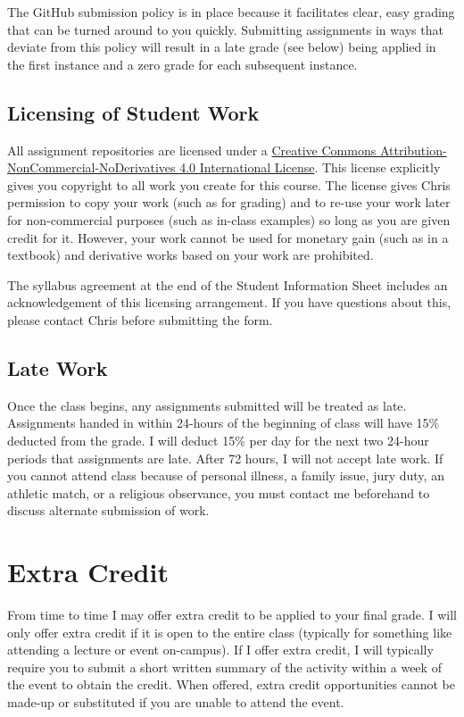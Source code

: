\documentclass[]{book}
\theoremstyle{definition}
\theoremstyle{definition}
\theoremstyle{definition}
\theoremstyle{remark}
\begin{document}
The GitHub submission policy is in place because it facilitates clear,
easy grading that can be turned around to you quickly. Submitting
assignments in ways that deviate from this policy will result in a late
grade (see below) being applied in the first instance and a zero grade
for each subsequent instance.

\subsection{Licensing of Student Work}\label{licensing-of-student-work}

All assignment repositories are licensed under a
\href{https://creativecommons.org/licenses/by-nc-nd/4.0/}{Creative
Commons Attribution-NonCommercial-NoDerivatives 4.0 International
License}. This license explicitly gives you copyright to all work you
create for this course. The license gives Chris permission to copy your
work (such as for grading) and to re-use your work later for
non-commercial purposes (such as in-class examples) so long as you are
given credit for it. However, your work cannot be used for monetary gain
(such as in a textbook) and derivative works based on your work are
prohibited.

The syllabus agreement at the end of the Student Information Sheet
includes an acknowledgement of this licensing arrangement. If you have
questions about this, please contact Chris before submitting the form.

\subsection{Late Work}\label{late-work}

Once the class begins, any assignments submitted will be treated as
late. Assignments handed in within 24-hours of the beginning of class
will have 15\% deducted from the grade. I will deduct 15\% per day for
the next two 24-hour periods that assignments are late. After 72 hours,
I will not accept late work. If you cannot attend class because of
personal illness, a family issue, jury duty, an athletic match, or a
religious observance, you must contact me beforehand to discuss
alternate submission of work.

\section{Extra Credit}\label{extra-credit}

From time to time I may offer extra credit to be applied to your final
grade. I will only offer extra credit if it is open to the entire class
(typically for something like attending a lecture or event on-campus).
If I offer extra credit, I will typically require you to submit a short
written summary of the activity within a week of the event to obtain the
credit. When offered, extra credit opportunities cannot be made-up or
substituted if you are unable to attend the event.
\end{document}
